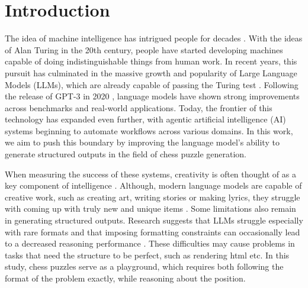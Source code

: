 \section{Introduction}
\label{sec:introduction}

The idea of machine intelligence has intrigued people for decades \cite{turing1950computingmachineryandintelligence}. With the ideas of Alan Turing in the 20th century, people have started developing machines capable of doing indistinguishable things from human work. In recent years, this pursuit has culminated in the massive growth and popularity of Large Language Models (LLMs), which are already capable of passing the Turing test \cite{jones2026largelanguagemodelspassastandardthreepartyturingtest}. Following the release of GPT-3 in 2020 \cite{GPT3}, language models have shown strong improvements across benchmarks and real-world applications. Today, the frontier of this technology has expanded even further, with agentic artificial intelligence (AI) systems beginning to automate workflows across various domains. In this work, we aim to push this boundary by improving the language model's ability to generate structured outputs in the field of chess puzzle generation.

When measuring the success of these systems, creativity is often thought of as a key component of intelligence \cite{colton2012computationalcreativity}. Although, modern language models are capable of creative work, such as creating art, writing stories or making lyrics, they struggle with coming up with truly new and unique items \cite{wenger2026llmsarehomogenouslycreative}. Some limitations also remain in generating structured outputs. Research suggests that LLMs struggle especially with rare formats \cite{yang2026structeval} and that imposing formatting constraints can occasionally lead to a decreased reasoning performance \cite{yuan2026quantifyingtheimpactofstructuredoutputformatonllms}. These difficulties may cause problems in tasks that need the structure to be perfect, such as rendering html etc. In this study, chess puzzles serve as a playground, which requires both following the format of the problem exactly, while reasoning about the position.

